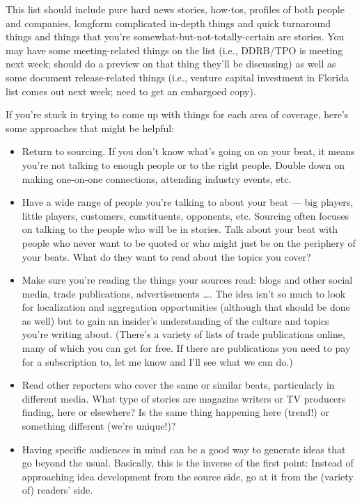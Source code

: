 \documentclass[
  12pt,
  american,
  letterpaperpaper,
  extrafontsizes,onecolumn,openright
  ]{memoir}
\providecommand{\tightlist}{%
  \setlength{\itemsep}{0pt}\setlength{\parskip}{0pt}}
\begin{document}
This list should include pure hard news stories, how-tos, profiles of both people and companies, longform complicated in-depth things and quick turnaround things and things that you're somewhat-but-not-totally-certain are stories. You may have some meeting-related things on the list (i.e., DDRB/TPO is meeting next week; should do a preview on that thing they'll be discussing) as well as some document release-related things (i.e., venture capital investment in Florida list comes out next week; need to get an embargoed copy).

If you're stuck in trying to come up with things for each area of coverage, here's some approaches that might be helpful:

\begin{itemize}
\tightlist
\item
  Return to sourcing. If you don't know what's going on on your beat, it means you're not talking to enough people or to the right people. Double down on making one-on-one connections, attending industry events, etc.
\item
  Have a wide range of people you're talking to about your beat --- big players, little players, customers, constituents, opponents, etc. Sourcing often focuses on talking to the people who will be in stories. Talk about your beat with people who never want to be quoted or who might just be on the periphery of your beats. What do they want to read about the topics you cover?
\item
  Make sure you're reading the things your sources read: blogs and other social media, trade publications, advertisements \ldots. The idea isn't so much to look for localization and aggregation opportunities (although that should be done as well) but to gain an insider's understanding of the culture and topics you're writing about. (There's a variety of lists of trade publications online, many of which you can get for free. If there are publications you need to pay for a subscription to, let me know and I'll see what we can do.)
\item
  Read other reporters who cover the same or similar beats, particularly in different media. What type of stories are magazine writers or TV producers finding, here or elsewhere? Is the same thing happening here (trend!) or something different (we're unique!)?
\item
  Having specific audiences in mind can be a good way to generate ideas that go beyond the usual. Basically, this is the inverse of the first point: Instead of approaching idea development from the source side, go at it from the (variety of) readers' side.


\end{itemize}
\end{document}
